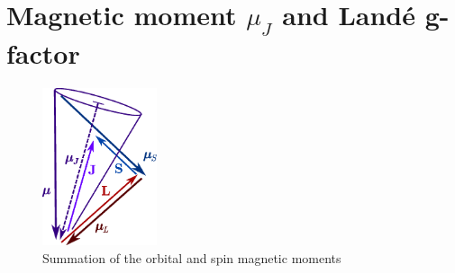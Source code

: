 \section{Magnetic moment $\mu_J$ and Land\'{e} g-factor}

\begin{figure}[h!]
\centering
\includegraphics[width=0.3\textwidth]{magnetism/figures/mu_J}
\caption{Summation of the orbital and spin magnetic moments\label{fig:mu_J}}
\end{figure}

